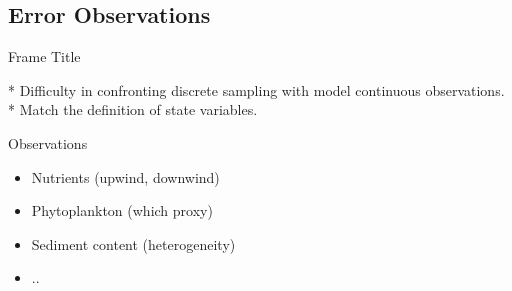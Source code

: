 \documentclass[final,xcolor=dvipsnames]{beamer}
\begin{document}
\subsection{Error Observations}
\begin{frame}{Frame Title}
    

* Difficulty in confronting discrete sampling with model continuous observations. 
* Match the definition of state variables.

\begin{exampleblock}{Observations}
\begin{itemize}
    \item Nutrients (upwind, downwind)
    \item Phytoplankton (which proxy)
    \item Sediment content (heterogeneity)
    \item .. 
\end{itemize} 
\end{exampleblock}
\end{frame}
\end{document}
